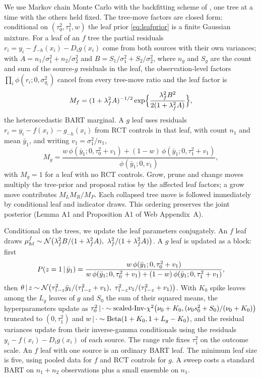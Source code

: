 We use Markov chain Monte Carlo with the backfitting scheme of \citet{Chipman2010BART}, one tree at a time with the others held fixed. The tree-move factors are closed form: conditional on $(\tau_0^2,\tau_1^2,w)$ the leaf prior \eqref{eq:leafprior} is a finite Gaussian mixture. For a leaf of an $f$ tree the partial residuals $r_i=y_i-f_{-h}(x_i)-D_ig(x_i)$ come from both sources with their own variances; with $A=n_1/\sigma_1^2+n_2/\sigma_2^2$ and $B=S_1/\sigma_1^2+S_2/\sigma_2^2$, where $n_g$ and $S_g$ are the count and sum of the source-$g$ residuals in the leaf, the observation-level factors $\prod_i\phi(r_i;0,\sigma^2_{g_i})$ cancel from every tree-move ratio and the leaf factor is
\begin{equation}
M_f=(1+\lambda_f^2A)^{-1/2}\exp\Bigl\{\frac{\lambda_f^2B^2}{2(1+\lambda_f^2A)}\Bigr\},
\label{eq:Mf}
\end{equation}
the heteroscedastic BART marginal. A $g$ leaf uses residuals $r_i=y_i-f(x_i)-g_{-h}(x_i)$ from RCT controls in that leaf, with count $n_1$ and mean $\bar y_1$, and writing $v_1=\sigma_1^2/n_1$,
\begin{equation}
M_g=\frac{w\,\phi(\bar y_1;0,\tau_0^2+v_1)+(1-w)\,\phi(\bar y_1;0,\tau_1^2+v_1)}{\phi(\bar y_1;0,v_1)},
\label{eq:Mg}
\end{equation}
with $M_g=1$ for a leaf with no RCT controls. Grow, prune and change moves multiply the tree-prior and proposal ratios by the affected leaf factors; a grow move contributes $M_LM_R/M_P$. Each collapsed tree move is followed immediately by conditional leaf and indicator draws. This ordering preserves the joint posterior (Lemma A1 and Proposition A1 of Web Appendix~A).

Conditional on the trees, we update the leaf parameters conjugately. An $f$ leaf draws $\mu^f_{h\ell}\sim\Normal\bigl(\lambda_f^2B/(1+\lambda_f^2A),\ \lambda_f^2/(1+\lambda_f^2A)\bigr)$. A $g$ leaf is updated as a block: first
\begin{equation}
P(z=1\,\vert\,\bar y_1)=\frac{w\,\phi(\bar y_1;0,\tau_0^2+v_1)}{w\,\phi(\bar y_1;0,\tau_0^2+v_1)+(1-w)\,\phi(\bar y_1;0,\tau_1^2+v_1)},
\label{eq:zpost}
\end{equation}
then $\theta\given z\sim\Normal\bigl(\tau_{1-z}^2\bar y_1/(\tau_{1-z}^2+v_1),\ \tau_{1-z}^2v_1/(\tau_{1-z}^2+v_1)\bigr)$. With $K_0$ spike leaves among the $L_g$ leaves of $g$ and $S_0$ the sum of their squared means, the hyperparameters update as $\tau_0^2\,\vert\,\cdot\sim\text{scaled-Inv-}\chi^2\bigl(\nu_0+K_0,(\nu_0s_0^2+S_0)/(\nu_0+K_0)\bigr)$ truncated to $(0,\tau_1^2)$ and $w\,\vert\,\cdot\sim\mathrm{Beta}(1+K_0,1+L_g-K_0)$, and the residual variances update from their inverse-gamma conditionals using the residuals $y_i-f(x_i)-D_ig(x_i)$ of each source. The range rule fixes $\tau_1^2$ on the outcome scale. An $f$ leaf with one source is an ordinary BART leaf. The minimum leaf size is five, using pooled data for $f$ and RCT controls for $g$. A sweep costs a standard BART on $n_1+n_2$ observations plus a small ensemble on $n_1$.

